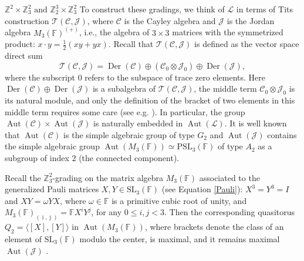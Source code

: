 \documentclass[a4paper,reqno]{amsart}
\theoremstyle{definition}
\numberwithin{theorem}{section}
\numberwithin{equation}{section}
\begin{document}
\medskip

$\boxed{{\mathbb{Z}}^2\times{\mathbb{Z}}_3^2\text{ and }{\mathbb{Z}}_2^3\times{\mathbb{Z}}_3^2}$\quad
To construct these gradings, we think of ${\mathcal{L}}$ in terms of Tits construction ${\mathcal{T}}({\mathcal{C}},{\mathcal{J}})$, where ${\mathcal{C}}$ is the Cayley algebra and ${\mathcal{J}}$ is the Jordan algebra $M_3({\mathbb{F}})^{(+)}$, i.e., the algebra of $3\times 3$ matrices with the symmetrized product: $x\cdot y=\frac{1}{2}(xy+yx)$. Recall that ${\mathcal{T}}({\mathcal{C}},{\mathcal{J}})$ is defined as the vector space direct sum
\[
{\mathcal{T}}({\mathcal{C}},{\mathcal{J}})=\operatorname{\mathrm{Der}}({\mathcal{C}})\oplus({\mathcal{C}}_0\otimes{\mathcal{J}}_0)\oplus\operatorname{\mathrm{Der}}({\mathcal{J}}),
\]
where the subscript $0$ refers to the subspace of trace zero elements. Here $\operatorname{\mathrm{Der}}({\mathcal{C}})\oplus\operatorname{\mathrm{Der}}({\mathcal{J}})$ is a subalgebra of ${\mathcal{T}}({\mathcal{C}},{\mathcal{J}})$, the middle term ${\mathcal{C}}_0\otimes{\mathcal{J}}_0$ is its natural module, and only the definition of the bracket of two elements in this middle term requires some care (see e.g. \cite[\S 6.2]{EK_mon}). In particular, the group $\operatorname{\mathrm{Aut}}({\mathcal{C}})\times\operatorname{\mathrm{Aut}}({\mathcal{J}})$ is naturally embedded in $\operatorname{\mathrm{Aut}}({\mathcal{L}})$. It is well known that $\operatorname{\mathrm{Aut}}({\mathcal{C}})$ is the simple algebraic group of type $G_2$ and $\operatorname{\mathrm{Aut}}({\mathcal{J}})$ contains the simple algebraic group $\operatorname{\mathrm{Aut}}(M_3({\mathbb{F}}))\simeq{\mathrm{PSL}}_3({\mathbb{F}})$ of type $A_2$ as a subgroup of index $2$ (the connected component).

Recall the ${\mathbb{Z}}_3^2$-grading on the matrix algebra $M_3({\mathbb{F}})$ associated to the generalized Pauli matrices $X,Y\in{\mathrm{SL}}_3({\mathbb{F}})$ (see Equation \eqref{Pauli}):  $X^3=Y^3=I$ and $XY=\omega YX$, where $\omega\in{\mathbb{F}}$ is a primitive cubic root of unity, and $M_3({\mathbb{F}})_{(\bar{\imath},\bar{\jmath})}={\mathbb{F}} X^iY^j$, for any $0\leq i,j<3$. Then the corresponding quasitorus $Q_2=\langle [X],[Y]\rangle$ in $\operatorname{\mathrm{Aut}}(M_3({\mathbb{F}}))$, where brackets denote the class of an element of ${\mathrm{SL}}_3({\mathbb{F}})$ modulo the center, is maximal, and it remains maximal $\operatorname{\mathrm{Aut}}({\mathcal{J}})$ \cite[\S 5.6]{EK_mon}.
\end{document}

